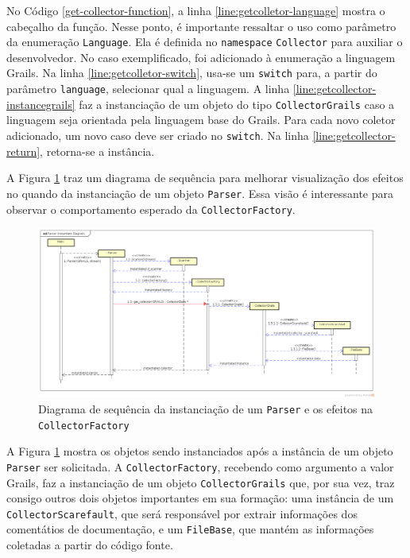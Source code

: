 No Código \ref{get-collector-function}, a linha \ref{line:getcolletor-language}
mostra o cabeçalho da função. Nesse ponto, é importante ressaltar o uso como
parâmetro da enumeração \lstinline|Language|. Ela é definida no \lstinline|namespace|
\lstinline|Collector| para auxiliar o desenvolvedor. No caso exemplificado, foi
adicionado à enumeração a linguagem \textsf{Grails}. Na linha
\ref{line:getcolletor-switch}, usa-se um \lstinline|switch| para, a partir do parâmetro
\lstinline|language|, selecionar qual a linguagem. A linha
\ref{line:getcollector-instancegrails} faz a instanciação de um objeto do tipo
\lstinline|CollectorGrails| caso a linguagem seja orientada pela linguagem base do \textsf{Grails}. Para cada novo
coletor adicionado, um novo caso deve ser criado no \lstinline|switch|. Na linha
\ref{line:getcollector-return}, retorna-se a instância.

A Figura \ref{parser-instance-sequence-diagram} traz um diagrama de sequência para melhorar
visualização dos efeitos no \scarefault quando da instanciação de um objeto \lstinline|Parser|.
Essa visão é interessante para observar o comportamento esperado da
\lstinline|CollectorFactory|.
\begin{landscape}
\begin{figure}[h]
  \centering
    \includegraphics[width=1.5\textwidth, height=\textheight]{figuras/parser-instance-sequence-diagram.png}
    \caption{Diagrama de sequência da instanciação de um \lstinline|Parser| e os efeitos na \lstinline|CollectorFactory|}
    \label{parser-instance-sequence-diagram}
\end{figure}
\FloatBarrier
\end{landscape}

A Figura \ref{parser-instance-sequence-diagram} mostra os objetos sendo
instanciados após a instância de um objeto \lstinline|Parser| ser solicitada.
A \lstinline|CollectorFactory|, recebendo como argumento a valor \textsf{Grails},
faz a instanciação de um objeto \lstinline|CollectorGrails| que, por sua vez,
traz consigo outros dois objetos importantes em sua formação: uma instância de um
\lstinline|CollectorScarefault|, que será responsável por extrair informações
dos comentátios de documentação, e um \lstinline|FileBase|, que mantém as informações
coletadas a partir do código fonte.


